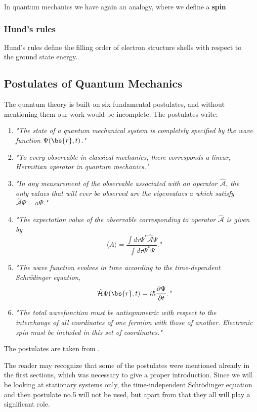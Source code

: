 In quantum mechanics we have again an analogy, where we define a \textbf{spin} 

\subsubsection{Hund's rules}
Hund's rules define the filling order of electron structure shells with respect to the ground state energy. 

\subsection{Postulates of Quantum Mechanics}
The quantum theory is built on six fundamental postulates, and without mentioning them our work would be incomplete. The postulates write:

\begin{enumerate}
\item \textit{"The state of a quantum mechanical system is completely specified by the wave function $\Psi(\bs{r},t)$."}

\item \textit{"To every observable in classical mechanics, there corresponds a linear, Hermitian operator in quantum mechanics."}

\item \textit{"In any measurement of the observable associated with an operator $\hat{\mathcal{A}}$, the only values that will ever be observed are the eigenvalues $a$ which satisfy $\hat{\mathcal{A}}\Psi=a\Psi$."}

\item \textit{"The expectation value of the observable corresponding to operator $\hat{\mathcal{A}}$ is given by
$$\langle A\rangle=\frac{\int d\tau\Psi^*\hat{\mathcal{A}}\Psi}{\int d\tau\Psi^*\Psi}.\textit{"}$$}

\item \textit{"The wave function evolves in time according to the time-dependent Schrödinger equation,
$$\hat{\mathcal{H}}\Psi(\bs{r},t)=i\hbar\frac{\partial\Psi}{\partial t}.\textit{"}$$}

\item \textit{"The total wavefunction must be antisymmetric with respect to the interchange of all coordinates of one fermion with those of another. Electronic spin must be included in this set of coordinates."} 
\end{enumerate}
The postulates are taken from \cite{sherrill_david_postulates_2003}.

The reader may recognize that some of the postulates were mentioned already in the first sections, which was necessary to give a proper introduction. Since we will be looking at stationary systems only, the time-independent Schrödinger equation and then postulate no.5 will not be used, but apart from that they all will play a significant role. 

